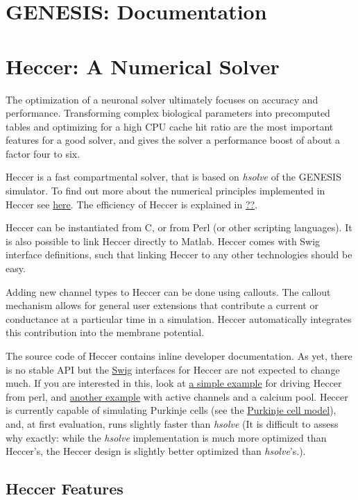 \documentclass[12pt]{article}
\begin{document}
\section*{GENESIS: Documentation}

\section*{Heccer: A Numerical Solver}

The optimization of a neuronal solver ultimately focuses on accuracy and performance. Transforming complex biological parameters into precomputed tables and optimizing for a high CPU cache hit ratio are the most important features for a good solver, and gives the solver a performance boost of about a factor four to six.

Heccer is a fast compartmental solver, that is based on {\it hsolve} of the GENESIS simulator. To find out more about the numerical principles implemented in Heccer see \href{}{here}. The efficiency of Heccer is explained in \href{}{??}.

Heccer can be instantiated from C, or from Perl (or other scripting languages). It is also possible to link Heccer directly to Matlab. Heccer comes with Swig interface definitions, such that linking Heccer to any other technologies should be easy.

Adding new channel types to Heccer can be done using callouts. The callout mechanism allows for general user extensions that contribute a current or conductance at a particular time in a simulation. Heccer automatically integrates this contribution into the membrane potential.

The source code of Heccer contains inline developer documentation. As yet, there is no stable API but the \href{}{Swig} interfaces for Heccer are not expected to change much. If you are interested in this, look at \href{}{a simple example} for driving Heccer from perl, and \href{}{another example} with active channels and a calcium pool. Heccer is currently capable of simulating Purkinje cells (see the \href{}{Purkinje cell model}), and, at first evaluation, runs slightly faster than {\it hsolve} (It is difficult to assess why exactly: while the {\it hsolve} implementation is much more optimized than Heccer's, the Heccer design is slightly better optimized than {\it hsolve}'s.).

\subsection*{Heccer Features}
\end{document}
